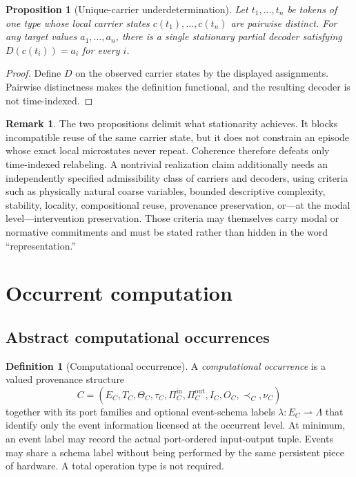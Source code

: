 \documentclass[11pt,a4paper]{article}
\theoremstyle{clean}
\newtheorem{proposition}[theorem]{Proposition}
\theoremstyle{definition}
\newtheorem{definition}[theorem]{Definition}
\newtheorem{remark}[theorem]{Remark}
\begin{document}
\begin{proposition}[Unique-carrier underdetermination]
Let $t_1,\dots,t_n$ be tokens of one type whose local carrier states $c(t_1),\dots,c(t_n)$ are pairwise distinct. For any target values $a_1,\dots,a_n$, there is a single stationary partial decoder satisfying $D(c(t_i))=a_i$ for every $i$.
\end{proposition}
\begin{proof}
Define $D$ on the observed carrier states by the displayed assignments. Pairwise distinctness makes the definition functional, and the resulting decoder is not time-indexed.
\end{proof}

\begin{remark}
The two propositions delimit what stationarity achieves. It blocks incompatible reuse of the same carrier state, but it does not constrain an episode whose exact local microstates never repeat. Coherence therefore defeats only time-indexed relabeling. A nontrivial realization claim additionally needs an independently specified admissibility class of carriers and decoders, using criteria such as physically natural coarse variables, bounded descriptive complexity, stability, locality, compositional reuse, provenance preservation, or---at the modal level---intervention preservation. Those criteria may themselves carry modal or normative commitments and must be stated rather than hidden in the word ``representation.''
\end{remark}

\section{Occurrent computation}

\subsection{Abstract computational occurrences}

\begin{definition}[Computational occurrence]
A \emph{computational occurrence} is a valued provenance structure
\[
C=(E_C,T_C,\Theta_C,\tau_C,
\Pi_C^{\mathrm{in}},\Pi_C^{\mathrm{out}},I_C,O_C,\prec_C,\nu_C)
\]
together with its port families and optional event-schema labels $\lambda:E_C\rightharpoonup\Lambda$ that identify only the event information licensed at the occurrent level. At minimum, an event label may record the actual port-ordered input-output tuple. Events may share a schema label without being performed by the same persistent piece of hardware. A total operation type is not required.
\end{definition}
\end{document}
